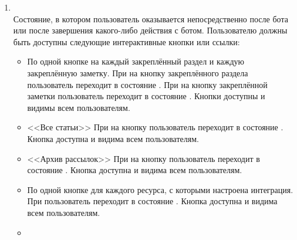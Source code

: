 \begin{enumerate}
            \item \label{itm:req:ui:states:mainmenu}
                 \\
                Состояние, в котором пользователь оказывается непосредственно после 
                бота или после завершения какого-либо действия с ботом. Пользователю должны быть доступны
                следующие интерактивные кнопки или ссылки:
                \begin{itemize}
                    \item
                        По одной кнопке на каждый закреплённый раздел и каждую закреплённую заметку.
                        При  на кнопку закреплённого раздела пользователь переходит
                        в состояние
                        \hyperref[itm:req:ui:states:navx]
                        {}.
                        При  на кнопку закреплённой заметки пользователь переходит
                        в состояние
                        \hyperref[itm:req:ui:states:view-note]
                        {}.
                        Кнопки доступны и видимы всем пользователям.
                    \item
                        <<Все статьи>>
                        При  на кнопку пользователь переходит в состояние
                        \hyperref[itm:req:ui:states:navx]
                        {}.
                        Кнопка доступна и видима всем пользователям.
                    \item
                        <<Архив рассылок>>
                        При  на кнопку пользователь переходит в состояние
                        \hyperref[itm:req:ui:states:navx]
                        {}.
                        Кнопка доступна и видима всем пользователям.
                    \item
                        По одной кнопке для каждого ресурса, с которыми настроена интеграция.
                        При  пользователь переходит в состояние
                        \hyperref[itm:req:ui:states:integrationx]
                        {}.
                        Кнопка доступна и видима всем пользователям.
                    \item

\end{itemize}
\end{enumerate}
